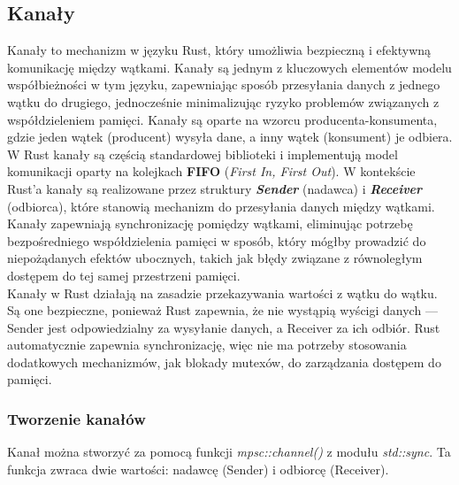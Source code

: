 \subsection{Kanały}

Kanały  to mechanizm w języku Rust, który umożliwia bezpieczną i efektywną komunikację między wątkami. Kanały są jednym z kluczowych elementów modelu współbieżności w tym języku, zapewniając sposób przesyłania danych z jednego wątku do drugiego, jednocześnie minimalizując ryzyko problemów związanych z współdzieleniem pamięci. Kanały są oparte na wzorcu producenta-konsumenta, gdzie jeden wątek (producent) wysyła dane, a inny wątek (konsument) je odbiera.
\\

W Rust kanały są częścią standardowej biblioteki i implementują model komunikacji oparty na kolejkach \textbf{FIFO} (\textit{First In, First Out}). W kontekście Rust'a kanały są realizowane przez struktury \textbf{\textit{Sender}} (nadawca) i \textbf{\textit{Receiver}} (odbiorca), które stanowią mechanizm do przesyłania danych między wątkami. Kanały zapewniają synchronizację pomiędzy wątkami, eliminując potrzebę bezpośredniego współdzielenia pamięci w sposób, który mógłby prowadzić do niepożądanych efektów ubocznych, takich jak błędy związane z równoległym dostępem do tej samej przestrzeni pamięci.
\\

Kanały w Rust działają na zasadzie przekazywania wartości z wątku do wątku. Są one bezpieczne, ponieważ Rust zapewnia, że nie wystąpią wyścigi danych — Sender jest odpowiedzialny za wysyłanie danych, a Receiver za ich odbiór. Rust automatycznie zapewnia synchronizację, więc nie ma potrzeby stosowania dodatkowych mechanizmów, jak blokady mutexów, do zarządzania dostępem do pamięci.

\subsubsection{Tworzenie kanałów}
Kanał można stworzyć za pomocą funkcji \textit{mpsc::channel()} z modułu \textit{std::sync}. Ta funkcja zwraca dwie wartości: nadawcę (Sender) i odbiorcę (Receiver).


